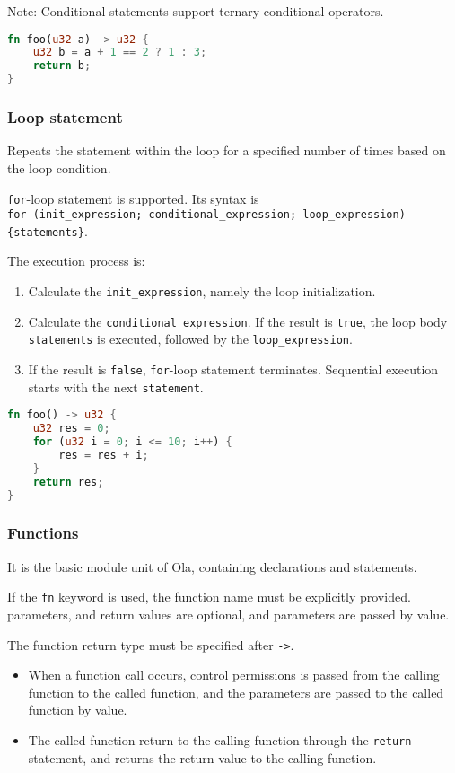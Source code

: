 Note: Conditional statements support ternary conditional operators.

\begin{lstlisting}[language=rust]
fn foo(u32 a) -> u32 {
    u32 b = a + 1 == 2 ? 1 : 3;
    return b;
}
\end{lstlisting}

\subsubsection*{Loop statement}

Repeats the statement within the loop for a specified number of times based on the loop condition.

\verb|for|-loop statement is supported. Its syntax is \\
\verb|for (init_expression; conditional_expression; loop_expression) {statements}|.

The execution process is:
\begin{enumerate}
    \item Calculate the \verb|init_expression|, namely the loop initialization.
    \item Calculate the \verb|conditional_expression|. If the result is \verb|true|, the loop body \verb|statements| is executed, followed by the \verb|loop_expression|.
    \item If the result is \verb|false|, \verb|for|-loop statement terminates. Sequential execution starts with the next \verb|statement|.
\end{enumerate}

\begin{lstlisting}[language=rust]
fn foo() -> u32 {
    u32 res = 0;
    for (u32 i = 0; i <= 10; i++) {
        res = res + i;
    }
    return res;
}
\end{lstlisting}

\subsubsection{Functions}

It is the basic module unit of Ola, containing declarations and statements.

If the \verb|fn| keyword is used, the function name must be explicitly provided. parameters, and return values are optional, and parameters are passed by value.

The function return type must be specified after \verb|->|.

\begin{itemize}
    \item When a function call occurs, control permissions is passed from the calling function to the called function, and the parameters are passed to the called function by value. 
    \item The called function return to the calling function through the \verb|return| statement, and returns the return value to the calling function.
\end{itemize}

